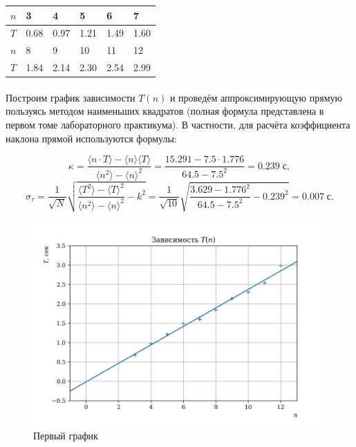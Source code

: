 \documentclass[a4paper,12pt]{article} %
\begin{document}
\begin{table}[h]
\begin{center}
\begin{tabularx}{\textwidth}{|l||Y|Y|Y|Y|Y|}
\hline
$n$ & 3 & 4 & 5 & 6 & 7 \\ \hline
$T$ & 0.68 & 0.97 & 1.21 & 1.49 & 1.60 \\ \hline
\hline
$n$ & 8 & 9 & 10 & 11 & 12 \\ \hline
$T$ & 1.84 & 2.14 & 2.30 & 2.54 & 2.99 \\ \hline
\end{tabularx}
\end{center}
\end{table}

\paragraph{} Построим график зависимости $T(n)$ и проведём аппроксимирующую прямую пользуясь методом наименьших квадратов (полная формула представлена в первом томе лабораторного практикума). В частности, для расчёта коэффициента наклона прямой используются формулы:

\[
\kappa = \frac{\langle n \cdot T \rangle - \langle n \rangle \langle T \rangle}{\langle n^2 \rangle - \langle n \rangle ^ 2} = \frac{15.291 - 7.5 \cdot 1.776}{64.5 - 7.5 ^ 2} = 0.239 \; \text{с},
\]
\[
\sigma_\tau = \frac{1}{\sqrt{N}}\sqrt{\frac{\langle T^2 \rangle - \langle T \rangle ^ 2}{\langle n^2 \rangle - \langle n \rangle ^ 2} - k^2} = \frac{1}{\sqrt{10}}\sqrt{\frac{3.629 - 1.776 ^ 2}{64.5 - 7.5 ^ 2} - 0.239^2} = 0.007 \; \text{с}.
\]

\begin{figure}
\begin{center}
\includegraphics[width=6in]{plot1.png}
\caption{Первый график}
\label{plot1}
\end{center}
\end{figure}
\end{document}
